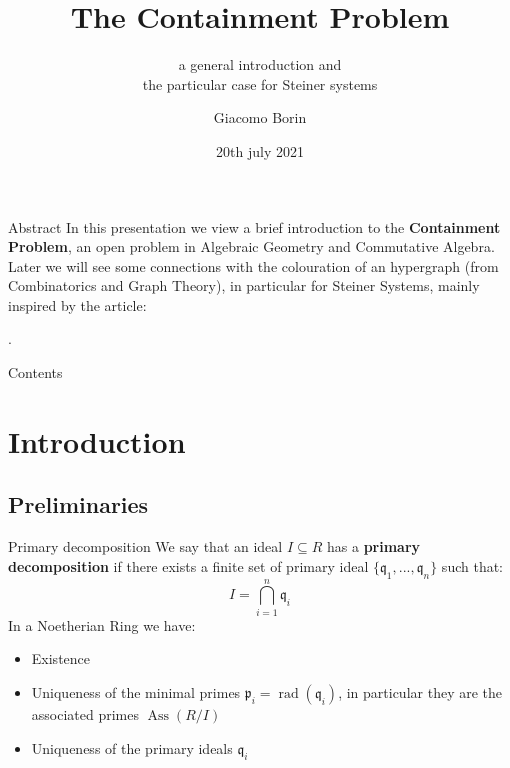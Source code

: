 \documentclass[dvipsnames]{beamer}
\title{The Containment Problem}
\subtitle{a general introduction and 
\\the particular case for Steiner systems}
\author{Giacomo Borin}
\institute{Università di Trento}
\date{20th july 2021}
\theoremstyle{plain}
\theoremstyle{remark}
\theoremstyle{definition}
\newtheorem{deff}[teo]{Definiton}
\newcommand{\p}{\mathfrak{p}}
\newcommand{\q}{\mathfrak{q}}
\DeclareMathOperator{\rad}{rad}
\DeclareMathOperator{\Ann}{Ann}
\DeclareMathOperator{\Ass}{Ass}
\begin{document}
\begin{frame}
  \titlepage
\end{frame}

\begin{frame}[fragile]{Abstract}
In this presentation we view a brief introduction to the \textbf{Containment Problem}, an open problem in Algebraic Geometry and Commutative Algebra.\\
Later we will see some connections with the colouration of an hypergraph (from Combinatorics and Graph Theory), in particular for Steiner Systems, mainly inspired by the article: \\
\begin{exampleblock}{}
.
\end{exampleblock}
\end{frame}

\begin{frame}{Contents}
  \tableofcontents
\end{frame}

\section{Introduction}

\subsection{Preliminaries}

%
%


\begin{frame}{Primary decomposition}
We say that an ideal $ I \subseteq R $ has a \textbf{primary decomposition}  if there exists a finite set of primary ideal $ \{ \q_1 , ... , \q_n\} $ such that:
\begin{equation*}
	I = \bigcap_{i=1}^n \q_i
\end{equation*}\pause
In a Noetherian Ring we have:
\begin{itemize}
\item Existence
\item Uniqueness of the minimal primes $ \p_i = \rad(\q_i)$, in particular they are the associated primes $ \Ass(R/I) $
\item Uniqueness of the primary ideals $ \q_i $
\end{itemize}
\end{frame}
\end{document}
